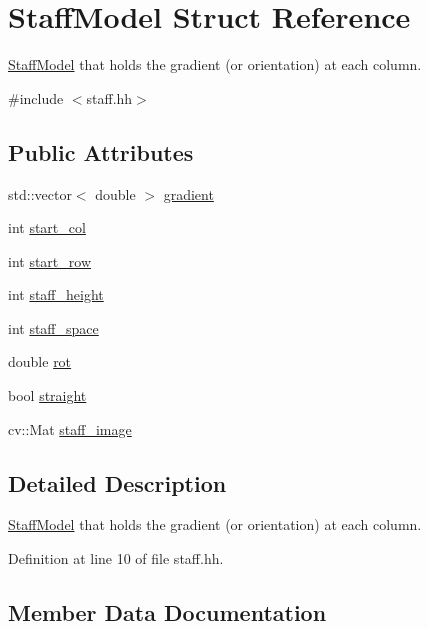 \hypertarget{structStaffModel}{}\section{Staff\+Model Struct Reference}
\label{structStaffModel}


\hyperlink{structStaffModel}{Staff\+Model} that holds the gradient (or orientation) at each column.  




{\ttfamily \#include $<$staff.\+hh$>$}

\subsection*{Public Attributes}
\begin{DoxyCompactItemize}
\item 
std\+::vector$<$ double $>$ \hyperlink{structStaffModel_a2c7b2b9d75456613e3543ccf9538ca94}{gradient}
\item 
int \hyperlink{structStaffModel_a0d40c0261502458fa794f81f7a39ffef}{start\+\_\+col}
\item 
int \hyperlink{structStaffModel_a116b56bb5fb2a12531ea020a5c93f9a7}{start\+\_\+row}
\item 
int \hyperlink{structStaffModel_a4bc9a16b2d5cdd2ba93926e2f208acf7}{staff\+\_\+height}
\item 
int \hyperlink{structStaffModel_a64ddccbd4d416dba382ae9f4f9bbe7fc}{staff\+\_\+space}
\item 
double \hyperlink{structStaffModel_aa887f6067d99543cc6ffaa237f19ef87}{rot}
\item 
bool \hyperlink{structStaffModel_aa3c9a53c181ac34279101f3aaa15f1e6}{straight}
\item 
cv\+::\+Mat \hyperlink{structStaffModel_a52f39a8c36879ed8e536fe6e3f89aeb7}{staff\+\_\+image}
\end{DoxyCompactItemize}


\subsection{Detailed Description}
\hyperlink{structStaffModel}{Staff\+Model} that holds the gradient (or orientation) at each column. 

Definition at line 10 of file staff.\+hh.



\subsection{Member Data Documentation}
